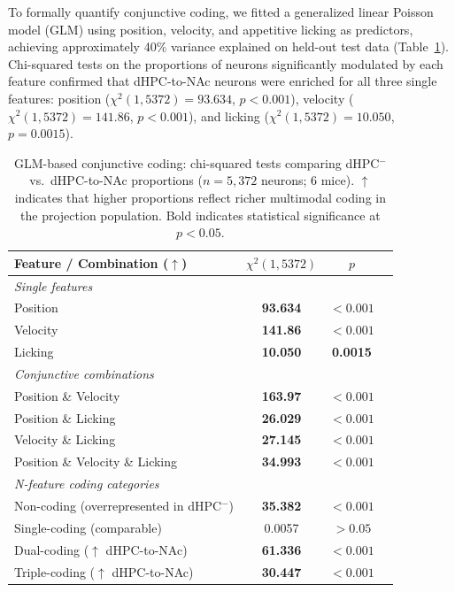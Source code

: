 \documentclass[11pt]{article}
\begin{document}
To formally quantify conjunctive coding, we fitted a generalized linear Poisson model (GLM) using position, velocity, and appetitive licking as predictors, achieving approximately 40\% variance explained on held-out test data (Table~\ref{tab:glm}). Chi-squared tests on the proportions of neurons significantly modulated by each feature confirmed that dHPC-to-NAc neurons were enriched for all three single features: position ($\chi^{2}(1, 5372)=93.634$, $p<0.001$), velocity ($\chi^{2}(1, 5372)=141.86$, $p<0.001$), and licking ($\chi^{2}(1, 5372)=10.050$, $p=0.0015$).

\begin{table}[H]
\centering
\caption{GLM-based conjunctive coding: chi-squared tests comparing dHPC$^{-}$ vs.\ dHPC-to-NAc proportions ($n=5{,}372$ neurons; 6 mice). $\uparrow$ indicates that higher proportions reflect richer multimodal coding in the projection population. Bold indicates statistical significance at $p<0.05$.}
\label{tab:glm}
\begin{tabular}{lccc}
\toprule
Feature / Combination ($\uparrow$) & $\chi^{2}(1, 5372)$ & $p$ \\
\midrule
\multicolumn{3}{l}{\textit{Single features}} \\
Position & \textbf{93.634} & $<0.001$ \\
Velocity & \textbf{141.86} & $<0.001$ \\
Licking & \textbf{10.050} & \textbf{0.0015} \\
\midrule
\multicolumn{3}{l}{\textit{Conjunctive combinations}} \\
Position \& Velocity & \textbf{163.97} & $<0.001$ \\
Position \& Licking & \textbf{26.029} & $<0.001$ \\
Velocity \& Licking & \textbf{27.145} & $<0.001$ \\
Position \& Velocity \& Licking & \textbf{34.993} & $<0.001$ \\
\midrule
\multicolumn{3}{l}{\textit{N-feature coding categories}} \\
Non-coding (overrepresented in dHPC$^{-}$) & \textbf{35.382} & $<0.001$ \\
Single-coding (comparable) & 0.0057 & $>0.05$ \\
Dual-coding ($\uparrow$ dHPC-to-NAc) & \textbf{61.336} & $<0.001$ \\
Triple-coding ($\uparrow$ dHPC-to-NAc) & \textbf{30.447} & $<0.001$ \\
\bottomrule
\end{tabular}
\end{table}
\end{document}
